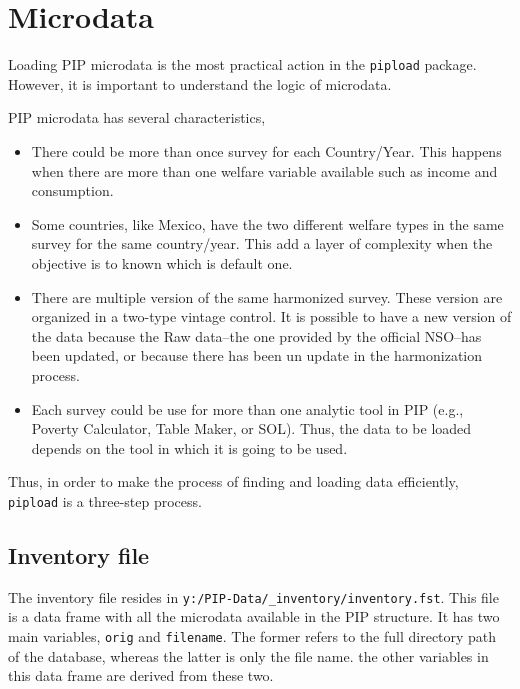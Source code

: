 \documentclass[
]{book}
\providecommand{\tightlist}{%
  \setlength{\itemsep}{0pt}\setlength{\parskip}{0pt}}
\begin{document}
\hypertarget{microdata}{%
\section{Microdata}\label{microdata}}

Loading PIP microdata is the most practical action in the \texttt{pipload} package. However, it is important to understand the logic of microdata.

PIP microdata has several characteristics,

\begin{itemize}
\tightlist
\item
  There could be more than once survey for each Country/Year. This happens when there are more than one welfare variable available such as income and consumption.
\item
  Some countries, like Mexico, have the two different welfare types in the same survey for the same country/year. This add a layer of complexity when the objective is to known which is default one.
\item
  There are multiple version of the same harmonized survey. These version are organized in a two-type vintage control. It is possible to have a new version of the data because the Raw data--the one provided by the official NSO--has been updated, or because there has been un update in the harmonization process.
\item
  Each survey could be use for more than one analytic tool in PIP (e.g., Poverty Calculator, Table Maker, or SOL). Thus, the data to be loaded depends on the tool in which it is going to be used.
\end{itemize}

Thus, in order to make the process of finding and loading data efficiently, \texttt{pipload} is a three-step process.

\hypertarget{inventory-file}{%
\subsection{Inventory file}\label{inventory-file}}

The inventory file resides in \texttt{y:/PIP-Data/\_inventory/inventory.fst}. This file is a data frame with all the microdata available in the PIP structure. It has two main variables, \texttt{orig} and \texttt{filename}. The former refers to the full directory path of the database, whereas the latter is only the file name. the other variables in this data frame are derived from these two.
\end{document}
